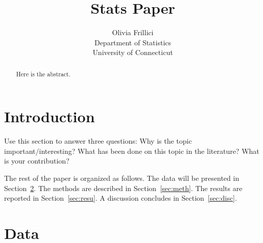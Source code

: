 \documentclass[12pt]{article}
\title{Stats Paper}
\author{Olivia Frillici\\
  Department of Statistics\\
  University of Connecticut
}
\begin{document}
\maketitle
\begin{abstract}
    Here is the abstract.  
    \end{abstract}
    
    
    \section{Introduction}
    \label{sec:intro}
    
    Use this section to answer three questions:
    Why is the topic important/interesting?
    What has been done on this topic in the literature?
    What is your contribution?

The rest of the paper is organized as follows.
The data will be presented in Section~\ref{sec:data}.
The methods are described in Section~\ref{sec:meth}.
The results are reported in Section~\ref{sec:resu}.
A discussion concludes in Section~\ref{sec:disc}.


\section{Data}
\label{sec:data}
\end{document}
